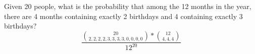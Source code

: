 \item Given 20 people, what is the probability that among the 12 months in the year, there are 4 months containing exactly 2 birthdays and 4 containing exactly 3 birthdays?
\[
\frac{\binom{20}{2,2,2,2,3,3,3,3,0,0,0,0} * \binom{12}{4,4,4}}{12^{20}}
\]
